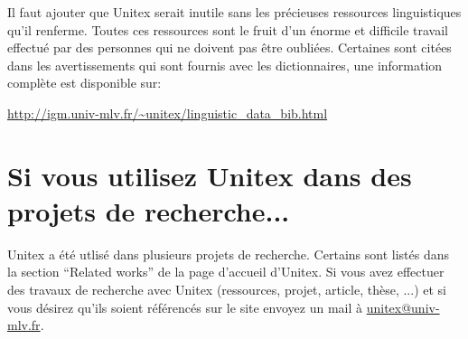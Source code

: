 \bigskip
\noindent Il faut ajouter que Unitex serait inutile sans les précieuses ressources linguistiques
qu'il renferme. Toutes ces ressources sont le fruit d'un énorme et difficile travail effectué par
des personnes qui ne doivent pas être oubliées. Certaines sont citées dans les avertissements qui
sont fournis avec les dictionnaires, une information complète est disponible sur:

\bigskip
\noindent \url{http://igm.univ-mlv.fr/~unitex/linguistic_data_bib.html}


\section*{Si vous utilisez Unitex dans des projets de recherche...}
Unitex a été utlisé dans plusieurs projets de recherche. Certains sont listés dans la section 
``Related works'' de la page d'accueil d'Unitex. Si vous avez effectuer des travaux de recherche
avec Unitex (ressources, projet, article, thèse, ...) et si vous désirez qu'ils soient référencés
sur le site envoyez un mail à \url{unitex@univ-mlv.fr}.


